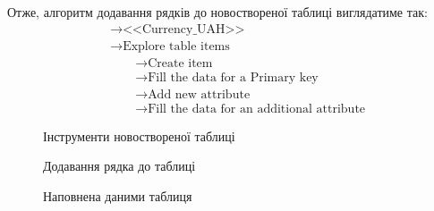 \documentclass[a4paper,14pt]{extarticle} %
\begin{document}
Отже, алгоритм додавання рядків до новоствореної таблиці виглядатиме так:
\begin{align*}
    &\rightarrow \text{<<Currency\_UAH>>} \\
    &\rightarrow \text{Explore table items} \\
    &\qquad \rightarrow \text{Create item} \\
    &\qquad \rightarrow \text{Fill the data for a Primary key} \\   
    &\qquad \rightarrow \text{Add new attribute} \\
    &\qquad \rightarrow \text{Fill the data for an additional attribute} 
\end{align*}

\begin{figure}[H]
    \caption{Інструменти новоствореної таблиці}
    \label{fig:explore table items AWS MC}
\end{figure}

\begin{figure}[H]
    \caption{Додавання рядка до таблиці}
    \label{fig:add an item AWS MC}
\end{figure}

\begin{figure}[H]
    \caption{Наповнена даними таблиця}
    \label{fig:creation finished AWS MC}
\end{figure}
\end{document}
